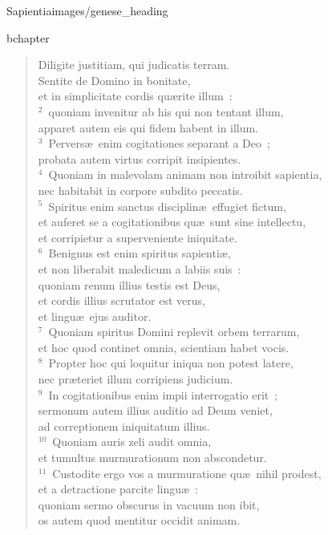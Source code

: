 {Sapientia}{images/genese_heading}

bchapter\begin{flushleft}\begin{verse}\vspace{-11pt}Diligite justitiam, qui judicatis terram.\\ Sentite de Domino in bonitate,\\ et in simplicitate cordis qu\ae rite illum~:\\
${}^{2}$~quoniam invenitur ab his qui non tentant illum,\\ apparet autem eis qui fidem habent in illum.\\
${}^{3}$~Pervers\ae\ enim cogitationes separant a Deo~;\\ probata autem virtus corripit insipientes.\\
${}^{4}$~Quoniam in malevolam animam non introibit sapientia,\\ nec habitabit in corpore subdito peccatis.\\
${}^{5}$~Spiritus enim sanctus disciplin\ae\ effugiet fictum,\\ et auferet se a cogitationibus qu\ae\ sunt sine intellectu,\\ et corripietur a superveniente iniquitate.\\
${}^{6}$~Benignus est enim spiritus sapienti\ae ,\\ et non liberabit maledicum a labiis suis~:\\ quoniam renum illius testis est Deus,\\ et cordis illius scrutator est verus,\\ et lingu\ae\ ejus auditor.\\
${}^{7}$~Quoniam spiritus Domini replevit orbem terrarum,\\ et hoc quod continet omnia, scientiam habet vocis.\\
${}^{8}$~Propter hoc qui loquitur iniqua non potest latere,\\ nec pr\ae teriet illum corripiens judicium.\\
${}^{9}$~In cogitationibus enim impii interrogatio erit~;\\ sermonum autem illius auditio ad Deum veniet,\\ ad correptionem iniquitatum illius.\\
${}^{10}$~Quoniam auris zeli audit omnia,\\ et tumultus murmurationum non abscondetur.\\
${}^{11}$~Custodite ergo vos a murmuratione qu\ae\ nihil prodest,\\ et a detractione parcite lingu\ae~:\\ quoniam sermo obscurus in vacuum non ibit,\\ os autem quod mentitur occidit animam.\end{verse}\end{flushleft}


